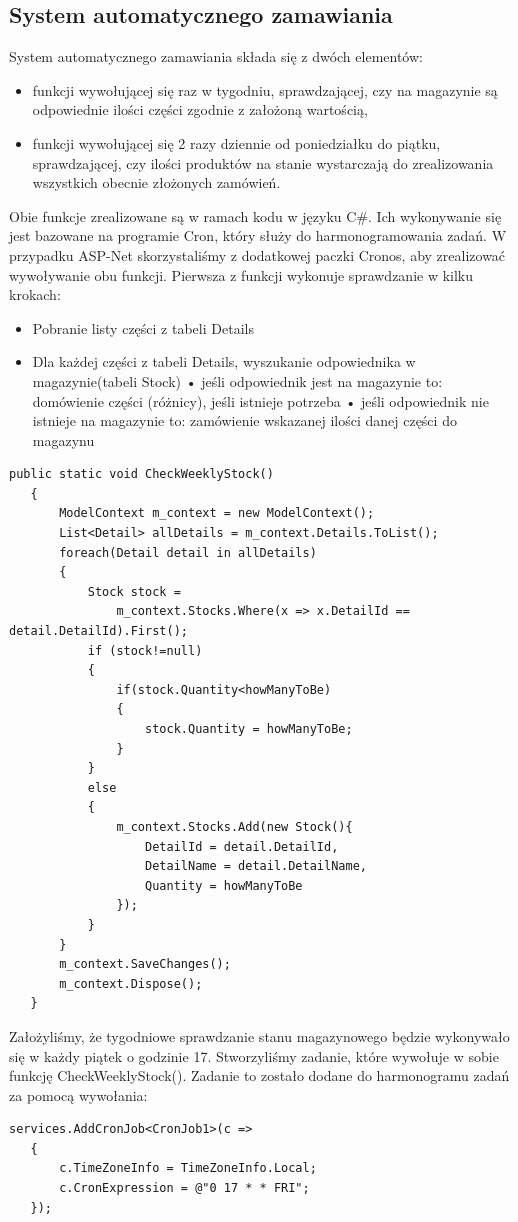 \documentclass{article}
\begin{document}
\subsection{System automatycznego zamawiania}
System automatycznego zamawiania składa się z dwóch elementów:
\begin{itemize}
   \item funkcji wywołującej się raz w tygodniu, sprawdzającej, czy na magazynie są odpowiednie
         ilości części zgodnie z założoną wartością,
   \item funkcji wywołującej się 2 razy dziennie od poniedziałku do piątku, sprawdzającej, czy
         ilości produktów na stanie wystarczają do zrealizowania wszystkich obecnie złożonych zamówień.
\end{itemize}
Obie funkcje zrealizowane są w ramach kodu w języku C\#. Ich wykonywanie się jest bazowane na
programie Cron, który służy do harmonogramowania zadań. W przypadku ASP-Net skorzystaliśmy z
dodatkowej paczki Cronos, aby zrealizować wywoływanie obu funkcji.
Pierwsza z funkcji wykonuje sprawdzanie w kilku krokach:
\begin{itemize}
   \item Pobranie listy części z tabeli Details
   \item Dla każdej części z tabeli Details, wyszukanie odpowiednika w magazynie(tabeli Stock)
         \subitem • jeśli odpowiednik jest na magazynie to: domówienie części (różnicy), jeśli istnieje
         potrzeba
         \subitem • jeśli odpowiednik nie istnieje na magazynie to: zamówienie wskazanej ilości danej części
         do magazynu
\end{itemize}
\begin{lstlisting}[style=sharpc,caption={Funkcja tygodniowego sprawdzania magazynu}]
   public static void CheckWeeklyStock()
   {
       ModelContext m_context = new ModelContext();
       List<Detail> allDetails = m_context.Details.ToList();
       foreach(Detail detail in allDetails)
       {
           Stock stock = 
               m_context.Stocks.Where(x => x.DetailId == detail.DetailId).First();
           if (stock!=null)
           {
               if(stock.Quantity<howManyToBe)
               {
                   stock.Quantity = howManyToBe;
               }
           }
           else
           {
               m_context.Stocks.Add(new Stock(){ 
                   DetailId = detail.DetailId, 
                   DetailName = detail.DetailName, 
                   Quantity = howManyToBe 
               });
           }
       }
       m_context.SaveChanges();
       m_context.Dispose();
   }
\end{lstlisting}
Założyliśmy, że tygodniowe sprawdzanie stanu magazynowego będzie wykonywało się w każdy piątek o
godzinie 17. Stworzyliśmy zadanie, które wywołuje w sobie funkcję CheckWeeklyStock(). Zadanie to
zostało dodane do harmonogramu zadań za pomocą wywołania: \newpage
\begin{lstlisting}[style=sharpc,caption={Dodanie zadania do harmonogramu},showstringspaces=false]
   services.AddCronJob<CronJob1>(c =>
   {
       c.TimeZoneInfo = TimeZoneInfo.Local;
       c.CronExpression = @"0 17 * * FRI";
   });
\end{lstlisting}
\end{document}
